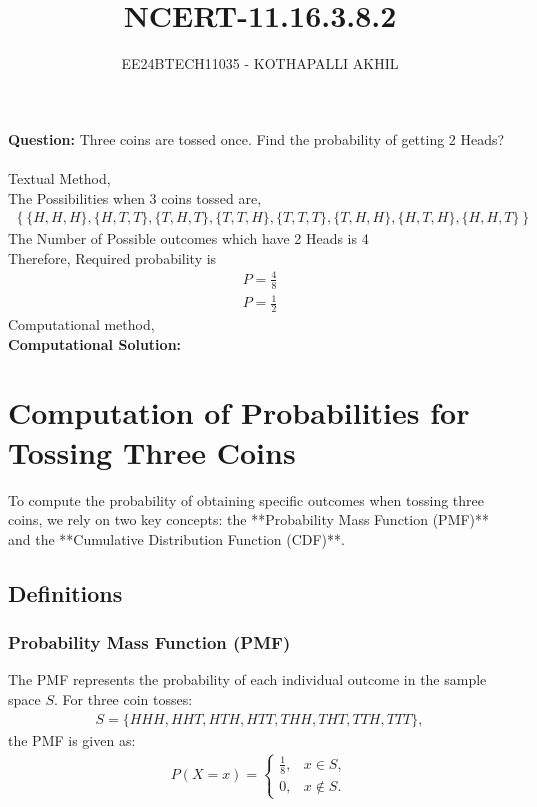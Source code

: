 \documentclass[article]{IEEEtran}
\numberwithin{figure}{enumi}
\begin{document}

\title{NCERT-11.16.3.8.2}
\author{EE24BTECH11035 - KOTHAPALLI AKHIL}
{\let\newpage\relax\maketitle}
\noindent\textbf{Question: }  Three coins are tossed once. Find the probability of getting 2 Heads?\\
\solution\\
Textual Method, \\
The Possibilities when 3 coins tossed  are, 
\begin{align}
\left\{\{H,H,H\}, \{H,T,T\}, \{T,H,T\}, \{T,T,H\}, \{T,T,T\}, \{T,H,H\}, \{H,T,H\}, \{H,H,T\}\right\}
\end{align}
The Number of Possible outcomes which have 2 Heads is 4\\
Therefore, Required probability is
\begin{align}
    P=\frac{4}{8}\\
    P=\frac{1}{2}
\end{align}
Computational method,\\
\textbf{Computational Solution:}\\

\section*{Computation of Probabilities for Tossing Three Coins}

To compute the probability of obtaining specific outcomes when tossing three coins, we rely on two key concepts: the **Probability Mass Function (PMF)** and the **Cumulative Distribution Function (CDF)**.

\subsection*{Definitions}
\subsubsection*{Probability Mass Function (PMF)}
The PMF represents the probability of each individual outcome in the sample space $ S $. For three coin tosses:
\begin{align}
S = \{HHH, HHT, HTH, HTT, THH, THT, TTH, TTT\},
\end{align}
the PMF is given as:
\begin{align}
P(X = x) =
\begin{cases}
\frac{1}{8}, & x \in S, \\
0, & x \notin S.
\end{cases}
\end{align}
\end{document}
